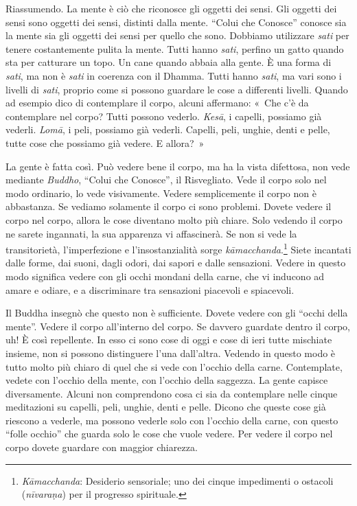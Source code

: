 Riassumendo. La mente è ciò che riconosce gli oggetti dei sensi. Gli
oggetti dei sensi sono oggetti dei sensi, distinti dalla mente. ``Colui
che Conosce'' conosce sia la mente sia gli oggetti dei sensi per quello
che sono. Dobbiamo utilizzare \emph{sati} per tenere costantemente
pulita la mente. Tutti hanno \emph{sati}, perfino un gatto quando sta
per catturare un topo. Un cane quando abbaia alla gente. È una forma di
\emph{sati}, ma non è \emph{sati} in coerenza con il Dhamma. Tutti hanno
\emph{sati}, ma vari sono i livelli di \emph{sati}, proprio come si
possono guardare le cose a differenti livelli. Quando ad esempio dico di
contemplare il corpo, alcuni affermano: «~Che c'è da contemplare nel
corpo? Tutti possono vederlo. \emph{Kesā}, i capelli, possiamo già
vederli. \emph{Lomā}, i peli, possiamo già vederli. Capelli, peli,
unghie, denti e pelle, tutte cose che possiamo già vedere. E allora?~»

La gente è fatta così. Può vedere bene il corpo, ma ha la vista
difettosa, non vede mediante \emph{Buddho}, ``Colui che Conosce'', il
Risvegliato. Vede il corpo solo nel modo ordinario, lo vede visivamente.
Vedere semplicemente il corpo non è abbastanza. Se vediamo solamente il
corpo ci sono problemi. Dovete vedere il corpo nel corpo, allora le cose
diventano molto più chiare. Solo vedendo il corpo ne sarete ingannati,
la sua apparenza vi affascinerà. Se non si vede la transitorietà,
l'imperfezione e l'insostanzialità sorge \emph{kāmacchanda}.\footnote{\emph{Kāmacchanda}:
  Desiderio sensoriale; uno dei cinque impedimenti o ostacoli
  (\emph{nīvaraṇa}) per il progresso spirituale.} Siete incantati dalle
forme, dai suoni, dagli odori, dai sapori e dalle sensazioni. Vedere in
questo modo significa vedere con gli occhi mondani della carne, che vi
inducono ad amare e odiare, e a discriminare tra sensazioni piacevoli e
spiacevoli.

Il Buddha insegnò che questo non è sufficiente. Dovete vedere con gli
``occhi della mente''. Vedere il corpo all'interno del corpo. Se davvero
guardate dentro il corpo, uh! È così repellente. In esso ci sono cose di
oggi e cose di ieri tutte mischiate insieme, non si possono distinguere
l'una dall'altra. Vedendo in questo modo è tutto molto più chiaro di
quel che si vede con l'occhio della carne. Contemplate, vedete con
l'occhio della mente, con l'occhio della saggezza. La gente capisce
diversamente. Alcuni non comprendono cosa ci sia da contemplare nelle
cinque meditazioni su capelli, peli, unghie, denti e pelle. Dicono che
queste cose già riescono a vederle, ma possono vederle solo con l'occhio
della carne, con questo ``folle occhio'' che guarda solo le cose che
vuole vedere. Per vedere il corpo nel corpo dovete guardare con maggior
chiarezza.

